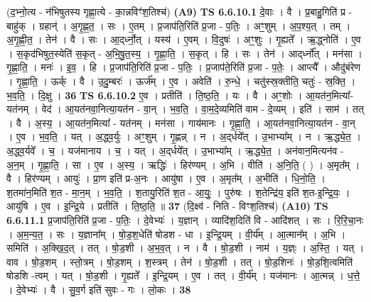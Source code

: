 \documentclass[17pt]{extarticle}
\begin{document}
                  \newline
                      (द॒भ्नो॒त्य - न॑भिषुतस्य गृह्णा॒त्ये - का॒न्नविꣳ॑श॒तिश्च॑)  \textbf{(A9)} \newline \newline
                                \textbf{ TS 6.6.10.1} \newline
                  दे॒वाः । वै । प्र॒बाहु॒गिति॑ प्र - बाहु॑क् । ग्रहान्॑ । अ॒गृ॒ह्ण॒त॒ । सः । ए॒तम् । प्र॒जाप॑ति॒रिति॑ प्र॒जा - प॒तिः॒ । अꣳ॒॒शुम् । अ॒प॒श्य॒त् । तम् । अ॒गृ॒ह्णी॒त॒ । तेन॑ । वै । सः । आ॒द्‌र्ध्नो॒त् । यस्य॑ । ए॒वम् । वि॒दुषः॑ । अꣳ॒॒शुः । गृ॒ह्यते᳚ । ऋ॒द्ध्नोति॑ । ए॒व । स॒कृद॑भिषुत॒स्येति॑ स॒कृत् - अ॒भि॒षु॒त॒स्य॒ । गृ॒ह्णा॒ति॒ । स॒कृत् । हि । सः । तेन॑ । आद्‌र्ध्नो᳚त् । मन॑सा । गृ॒ह्णा॒ति॒ । मनः॑ । इ॒व॒ । हि । प्र॒जाप॑ति॒रिति॑ प्र॒जा - प॒तिः॒ । प्र॒जाप॑ते॒रिति॑ प्र॒जा - प॒तेः॒ । आप्त्यै᳚ । औदु॑बंरेण । गृ॒ह्णा॒ति॒ । ऊर्क् । वै । उ॒दु॒म्बरः॑ । ऊर्ज᳚म् । ए॒व । अवेति॑ । रु॒न्धे॒ । चतु॑स्स्र॒क्तीति॒ चतुः॑ - स्र॒क्ति॒ । भ॒व॒ति॒ । दि॒क्षु । \textbf{  36} \newline
                  \newline
                                \textbf{ TS 6.6.10.2} \newline
                  ए॒व । प्रतीति॑ । ति॒ष्ठ॒ति॒ । यः । वै । अꣳ॒॒शोः । आ॒यत॑न॒मित्या᳚-यत॑नम् । वेद॑ । आ॒यत॑नवा॒नित्या॒यत॑न - वा॒न् । भ॒व॒ति॒ । वा॒म॒दे॒व्यमिति॑ वाम - दे॒व्यम् । इति॑ । साम॑ । तत् । वै । अ॒स्य॒ । आ॒यत॑न॒मित्या᳚ - यत॑नम् । मन॑सा । गाय॑मानः । गृ॒ह्णा॒ति॒ । आ॒यत॑नवा॒नित्या॒यत॑न - वा॒न् । ए॒व । भ॒व॒ति॒ । यत् । अ॒द्ध्व॒र्युः । अꣳ॒॒शुम् । गृ॒ह्णन्न् । न । अ॒द्‌र्धये᳚त् । उ॒भाभ्या᳚म् । न । ऋ॒द्ध्ये॒त॒ । अ॒द्ध्व॒र्यवे᳚ । च॒ । यज॑मानाय । च॒ । यत् । अ॒द्‌र्धये᳚त् । उ॒भाभ्या᳚म् । ऋ॒द्ध्ये॒त॒ । अन॑वान॒मित्यन॑व - अ॒न॒म् । गृ॒ह्णा॒ति॒ । सा । ए॒व । अ॒स्य॒ । ऋद्धिः॑ । हिर॑ण्यम् । अ॒भि । वीति॑ । अ॒नि॒ति॒ ( ) । अ॒मृत᳚म् । वै । हिर॑ण्यम् । आयुः॑ । प्रा॒ण इति॑ प्र-अ॒नः । आयु॑षा । ए॒व । अ॒मृत᳚म् । अ॒भीति॑ । धि॒नो॒ति॒ । श॒तमा॑न॒मिति॑ श॒त - मा॒न॒म् । भ॒व॒ति॒ । श॒तायु॒रिति॑ श॒त - आ॒युः॒ । पुरु॑षः । श॒तेन्द्रि॑य॒ इति॑ श॒त-इ॒न्द्रि॒यः॒ । आयु॑षि । ए॒व । इ॒न्द्रि॒ये । प्रतीति॑ । ति॒ष्ठ॒ति॒ ॥ \textbf{  37} \newline
                  \newline
                      (दि॒क्ष्व॑ - निति - विꣳश॒तिश्च॑)  \textbf{(A10)} \newline \newline
                                \textbf{ TS 6.6.11.1} \newline
                  प्र॒जाप॑ति॒रिति॑ प्र॒जा - प॒तिः॒ । दे॒वेभ्यः॑ । य॒ज्ञान् । व्यादि॑श॒दिति॑ वि - आदि॑शत् । सः । रि॒रि॒चा॒नः । अ॒म॒न्य॒त॒ । सः । य॒ज्ञाना᳚म् । षो॒ड॒श॒धेति॑ षोडश - धा । इ॒न्द्रि॒यम् । वी॒र्य᳚म् । आ॒त्मान᳚म् । अ॒भि । समिति॑ । अ॒क्खि॒द॒त् । तत् । षो॒ड॒शी । अ॒भ॒व॒त् । न । वै । षो॒ड॒शी । नाम॑ । य॒ज्ञ्ः । अ॒स्ति॒ । यत् । वाव । षो॒ड॒शम् । स्तो॒त्रम् । षो॒ड॒शम् । श॒स्त्रम् । तेन॑ । षो॒ड॒शी । तत् । षो॒ड॒शिनः॑ । षो॒ड॒शि॒त्वमिति॑ षोडशि -त्वम् । यत् । षो॒ड॒शी । गृ॒ह्यते᳚ । इ॒न्द्रि॒यम् । ए॒व । तत् । वी॒र्य᳚म् । यज॑मानः । आ॒त्मन्न् । ध॒त्ते॒ । दे॒वेभ्यः॑ । वै । सु॒व॒र्ग इति॑ सुवः - गः । लो॒कः । \textbf{  38} \newline
\end{document}
